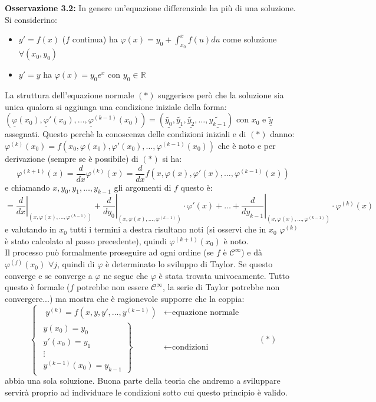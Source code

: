 \documentclass[a4paper,11pt,titlepage]{book}
\begin{document}
\textbf{Osservazione 3.2:} In genere un'equazione differenziale ha più di una soluzione. Si considerino:\begin{itemize}
\item $y'=f(x)$ ($f$ continua) ha $\varphi(x)=y_0+\int_{x_0}^xf(u)du$ come soluzione $\forall(x_0,y_0)$
\item $y'=y$ ha $\varphi(x)=y_0 e^x$ con $y_0\in\mathbb{R}$\\
\end{itemize}

La struttura dell'equazione normale $(*)$ suggerisce però che la soluzione sia unica qualora si aggiunga una condizione iniziale della forma: $ (\underline{\varphi}(x_0),\underline{\varphi}'(x_0),\ldots,\underline{\varphi}^{(k-1)}(x_0))=(\underline{\widetilde{y_0}},\underline{\widetilde{y_1}},\underline{\widetilde{y_2}},\ldots,\underline{\widetilde{y_{k-1}}})$ con $x_0$ e $\underline{\widetilde{y}}$ assegnati. Questo perchè la conoscenza delle condizioni iniziali e di $(*)$ danno: ${\varphi}^{(k)}(x_0)={f}(x_0,{\varphi}(x_0),{\varphi}'(x_0),\ldots,{\varphi}^{(k-1)}(x_0))$ che è noto e per derivazione (sempre se è possibile) di $(*)$ si ha: $$\varphi^{(k+1)}(x)=\frac{d}{dx}\varphi^{(k)}(x)=\frac{d}{dx}f(x,\varphi (x),\varphi'(x),\ldots,\varphi^{(k-1)}(x))$$ e chiamando $x,y_0,y_1,\ldots,y_{k-1}$ gli argomenti di $f$ questo è: $$=\left .\frac{d}{dx}\right|_{(x,\varphi(x),\ldots,\varphi^{(k-1)})}+\left .\frac{d}{dy_0}\right|_{(x,\varphi(x),\ldots,\varphi^{(k-1)})}\cdot\varphi'(x)+\ldots+\left .\frac{d}{dy_{k-1}}\right|_{(x,\varphi(x),\ldots,\varphi^{(k-1)})}\cdot\varphi^{(k)}(x)$$ e valutando in $x_0$ tutti i termini a destra risultano noti (si osservi che in $x_0$ $\varphi^{(k)}$ è stato calcolato al passo precedente), quindi $\varphi^{(k+1)}(x_0)$ è noto.\\

Il processo può formalmente proseguire ad ogni ordine (se $f$ è $\mathcal{C}^\infty$) e dà $\varphi^{(j)}(x_0)$ $\forall j$, quindi di $\varphi$ è determinato lo sviluppo di Taylor. Se questo converge e se converge a $\varphi$ ne segue che $\varphi$ è stata trovata univocamente. Tutto questo è formale ($f$ potrebbe non essere $\mathcal{C}^\infty$, la serie di Taylor potrebbe non convergere...) ma mostra che è ragionevole supporre che la coppia: $$\begin{cases}\mbox{  } y^{(k)}=f(x,y,y',\ldots,y^{(k-1)}) & \leftarrow \mbox{equazione normale}  \\ \left. \begin{array}{ll}
y(x_0)=y_0 \\ y'(x_0)=y_1\\ \vdots \\ y^{(k-1)}(x_0)=y_{k-1} 
\end{array}\right\} & \leftarrow\mbox{condizioni} \end{cases} \qquad (*)$$
abbia una sola soluzione. Buona parte della teoria che andremo a sviluppare servirà proprio ad individuare le condizioni sotto cui questo principio è valido.\\
\end{document}
